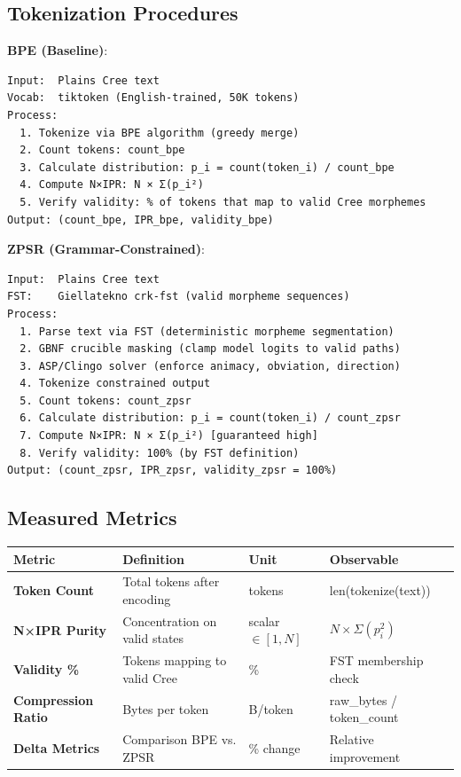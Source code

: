 \documentclass[11pt,oneside]{article}
\begin{document}
\subsection{Tokenization Procedures}

\textbf{BPE (Baseline)}:
\begin{lstlisting}
Input:  Plains Cree text
Vocab:  tiktoken (English-trained, 50K tokens)
Process:
  1. Tokenize via BPE algorithm (greedy merge)
  2. Count tokens: count_bpe
  3. Calculate distribution: p_i = count(token_i) / count_bpe
  4. Compute N×IPR: N × Σ(p_i²)
  5. Verify validity: % of tokens that map to valid Cree morphemes
Output: (count_bpe, IPR_bpe, validity_bpe)
\end{lstlisting}

\textbf{ZPSR (Grammar-Constrained)}:
\begin{lstlisting}
Input:  Plains Cree text
FST:    Giellatekno crk-fst (valid morpheme sequences)
Process:
  1. Parse text via FST (deterministic morpheme segmentation)
  2. GBNF crucible masking (clamp model logits to valid paths)
  3. ASP/Clingo solver (enforce animacy, obviation, direction)
  4. Tokenize constrained output
  5. Count tokens: count_zpsr
  6. Calculate distribution: p_i = count(token_i) / count_zpsr
  7. Compute N×IPR: N × Σ(p_i²) [guaranteed high]
  8. Verify validity: 100% (by FST definition)
Output: (count_zpsr, IPR_zpsr, validity_zpsr = 100%)
\end{lstlisting}

\subsection{Measured Metrics}

\begin{center}
\begin{tabular}{llll}
\toprule
Metric & Definition & Unit & Observable \\
\midrule
\textbf{Token Count} & Total tokens after encoding & tokens & len(tokenize(text)) \\
\textbf{N×IPR Purity} & Concentration on valid states & scalar $\in [1, N]$ & $N \times \Sigma(p_i^2)$ \\
\textbf{Validity \%} & Tokens mapping to valid Cree & \% & FST membership check \\
\textbf{Compression Ratio} & Bytes per token & B/token & raw\_bytes / token\_count \\
\textbf{Delta Metrics} & Comparison BPE vs. ZPSR & \% change & Relative improvement \\
\bottomrule
\end{tabular}
\end{center}
\end{document}
